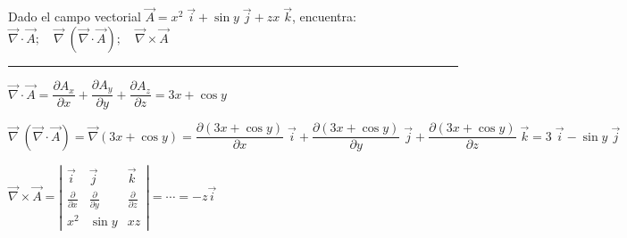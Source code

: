 \begin{miejercicio}
	
Dado el campo vectorial $\overrightarrow A =x^2 \; \vec i + \sin y \; \vec j + zx \; \vec k$, encuentra: $\overrightarrow {\nabla} \cdot \overrightarrow A; \quad \overrightarrow \nabla \; (\overrightarrow {\nabla} \cdot \overrightarrow A); \quad \overrightarrow {\nabla} \times \overrightarrow A$	

\rule{200pt}{0.1pt} 

\vspace{1mm}

$\overrightarrow{\nabla}\cdot \vec A = \dfrac {\partial A_x}{\partial x } + \dfrac {\partial A_y}{\partial y }+ \dfrac {\partial A_z}{\partial z } = 3x+\cos y$	

$\overrightarrow \nabla \; (\overrightarrow {\nabla} \cdot \overrightarrow A)= \overrightarrow \nabla (3x+\cos y)= \dfrac {\partial (3x+\cos y)}{\partial x}\; \vec i + \dfrac {\partial (3x+\cos y)}{\partial y}\; \vec j +\dfrac {\partial (3x+\cos y)}{\partial z}\; \vec k = 3\; \vec i - \sin y \; \vec j$

$\overrightarrow {\nabla} \times \overrightarrow A = \left|
\begin{matrix}
\vec i & \vec j	& \vec k \\
\frac {\partial}{\partial x} & \frac {\partial}{\partial y} & \frac {\partial}{\partial z} \\
x^2 & \sin y & xz
\end{matrix}  \right|=\cdots =-z \vec i$
\end{miejercicio}

